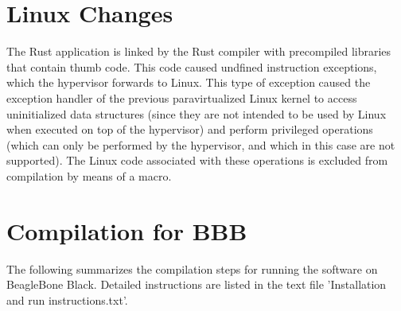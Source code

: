 \documentclass[11pt, a4paper]{article}
\begin{document}
\section*{Linux Changes}
The Rust application is linked by the Rust compiler with precompiled libraries
that contain thumb code. This code caused undfined instruction exceptions, which
the hypervisor forwards to Linux. This type of exception caused the exception
handler of the previous paravirtualized Linux kernel to access uninitialized
data structures (since they are not intended to be used by Linux when executed
on top of the hypervisor) and perform privileged operations (which can only be
performed by the hypervisor, and which in this case are not supported). The
Linux code associated with these operations is excluded from compilation by
means of a macro.

\section*{Compilation for BBB}
The following summarizes the compilation steps for running the software on
BeagleBone Black. Detailed instructions are listed in the text file 'Installation and run instructions.txt'.
\end{document}

